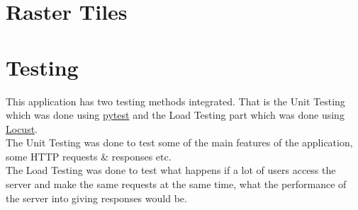 \section{Raster Tiles}


\section{Testing}
This application has two testing methods integrated. That is the Unit Testing which was done using \href{https://docs.pytest.org/en/latest/}{pytest} and the Load Testing part which was done using \href{https://locust.io/}{Locust}.\\
The Unit Testing was done to test some of the main features of the application, some HTTP requests \& responses etc.\\
The Load Testing was done to test what happens if a lot of users access the server and make the same requests at the same time, what the performance of the server into giving responses would be.
